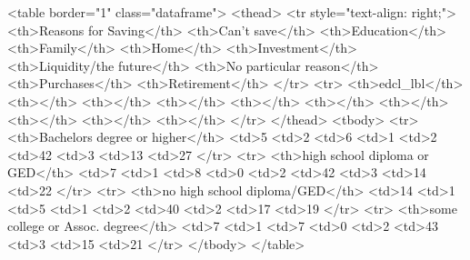 <table border="1" class="dataframe">
  <thead>
    <tr style="text-align: right;">
      <th>Reasons for Saving</th>
      <th>Can't save</th>
      <th>Education</th>
      <th>Family</th>
      <th>Home</th>
      <th>Investment</th>
      <th>Liquidity/the future</th>
      <th>No particular reason</th>
      <th>Purchases</th>
      <th>Retirement</th>
    </tr>
    <tr>
      <th>edcl_lbl</th>
      <th></th>
      <th></th>
      <th></th>
      <th></th>
      <th></th>
      <th></th>
      <th></th>
      <th></th>
      <th></th>
    </tr>
  </thead>
  <tbody>
    <tr>
      <th>Bachelors degree or higher</th>
      <td>5%
      <td>2%
      <td>6%
      <td>1%
      <td>2%
      <td>42%
      <td>3%
      <td>13%
      <td>27%
    </tr>
    <tr>
      <th>high school diploma or GED</th>
      <td>7%
      <td>1%
      <td>8%
      <td>0%
      <td>2%
      <td>42%
      <td>3%
      <td>14%
      <td>22%
    </tr>
    <tr>
      <th>no high school diploma/GED</th>
      <td>14%
      <td>1%
      <td>5%
      <td>1%
      <td>2%
      <td>40%
      <td>2%
      <td>17%
      <td>19%
    </tr>
    <tr>
      <th>some college or Assoc. degree</th>
      <td>7%
      <td>1%
      <td>7%
      <td>0%
      <td>2%
      <td>43%
      <td>3%
      <td>15%
      <td>21%
    </tr>
  </tbody>
</table>